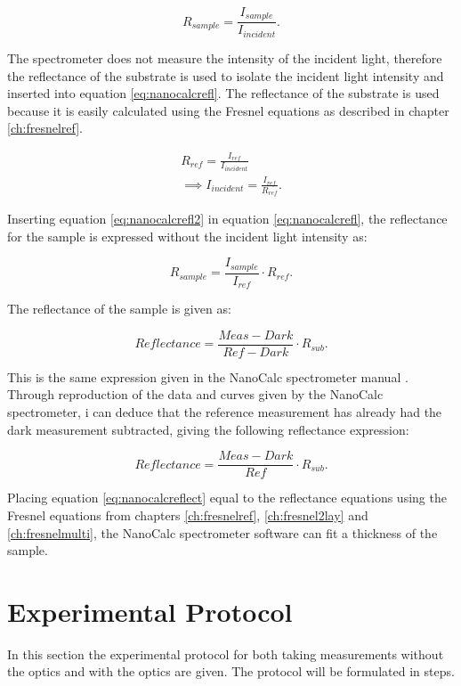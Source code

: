 \documentclass[MasterThesisMain.tex]{subfiles}
\begin{document}
\begin{equation}\label{eq:nanocalcrefl}
R_{sample} = \frac{I_{sample}}{I_{incident}}.
\end{equation}

The spectrometer does not measure the intensity of the incident light, therefore the reflectance of the substrate is used to isolate the incident light intensity and inserted into equation \ref{eq:nanocalcrefl}. The reflectance of the substrate is used because it is easily calculated using the Fresnel equations as described in chapter \ref{ch:fresnelref}.

\begin{align}
R_{ref} = \frac{I_{ref}}{I_{incident}}\\
\implies  I_{incident} = \frac{I_{ref}}{R_{ref}} \label{eq:nanocalcrefl2}.
\end{align}

Inserting equation \ref{eq:nanocalcrefl2} in equation \ref{eq:nanocalcrefl}, the reflectance for the sample is expressed without the incident light intensity as:

\begin{equation}
R_{sample} = \frac{I_{sample}}{I_{ref}} \cdot R_{ref}.
\end{equation}

The reflectance of the sample is given as:

\begin{equation}
Reflectance = \frac{Meas-Dark}{Ref-Dark} \cdot R_{sub}.
\end{equation}

This is the same expression given in the NanoCalc spectrometer manual \cite{nanocalcmanual}. Through reproduction of the data and curves given by the NanoCalc spectrometer, i can deduce that the reference measurement has already had the dark measurement subtracted, giving the following reflectance expression:

\begin{equation}\label{eq:nanocalcreflect}
Reflectance = \frac{Meas-Dark}{Ref} \cdot R_{sub}.
\end{equation}

Placing equation \ref{eq:nanocalcreflect} equal to the reflectance equations using the Fresnel equations from chapters  \ref{ch:fresnelref}, \ref{ch:fresnel2lay} and \ref{ch:fresnelmulti}, the NanoCalc spectrometer software can fit a thickness of the sample.


\section{Experimental Protocol}
In this section the experimental protocol for both taking measurements without the optics and with the optics are given. The protocol will be formulated in steps.
\end{document}
